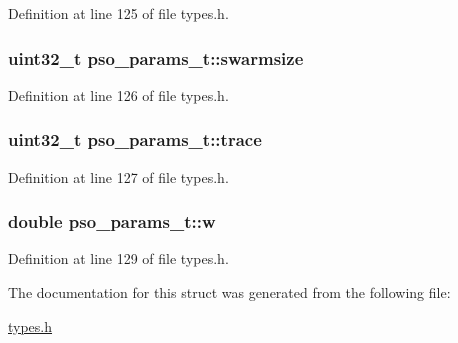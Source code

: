 Definition at line 125 of file types.\-h.

\hypertarget{structpso__params__t_a40e05fe53561f5e710058dbd51788313}{
\subsubsection[{swarmsize}]{\setlength{\rightskip}{0pt plus 5cm}uint32\-\_\-t pso\-\_\-params\-\_\-t\-::swarmsize}}\label{structpso__params__t_a40e05fe53561f5e710058dbd51788313}


Definition at line 126 of file types.\-h.

\hypertarget{structpso__params__t_a58ce20f72162622bead72d5f04a66766}{
\subsubsection[{trace}]{\setlength{\rightskip}{0pt plus 5cm}uint32\-\_\-t pso\-\_\-params\-\_\-t\-::trace}}\label{structpso__params__t_a58ce20f72162622bead72d5f04a66766}


Definition at line 127 of file types.\-h.

\hypertarget{structpso__params__t_aa2ba76335888b56c05aed664d67c370f}{
\subsubsection[{w}]{\setlength{\rightskip}{0pt plus 5cm}double pso\-\_\-params\-\_\-t\-::w}}\label{structpso__params__t_aa2ba76335888b56c05aed664d67c370f}


Definition at line 129 of file types.\-h.



The documentation for this struct was generated from the following file\-:\begin{DoxyCompactItemize}
\item 
\hyperlink{types_8h}{types.\-h}\end{DoxyCompactItemize}
